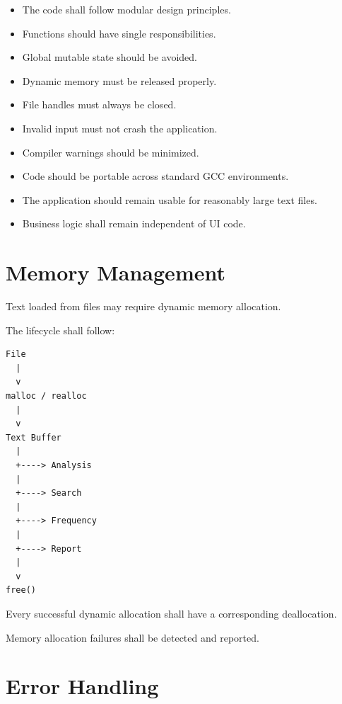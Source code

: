 \documentclass[12pt,a4paper]{article}
\begin{document}
\begin{itemize}
    \item The code shall follow modular design principles.
    \item Functions should have single responsibilities.
    \item Global mutable state should be avoided.
    \item Dynamic memory must be released properly.
    \item File handles must always be closed.
    \item Invalid input must not crash the application.
    \item Compiler warnings should be minimized.
    \item Code should be portable across standard GCC environments.
    \item The application should remain usable for reasonably large
          text files.
    \item Business logic shall remain independent of UI code.
\end{itemize}


\section{Memory Management}

Text loaded from files may require dynamic memory allocation.

The lifecycle shall follow:

\begin{verbatim}
File
  |
  v
malloc / realloc
  |
  v
Text Buffer
  |
  +----> Analysis
  |
  +----> Search
  |
  +----> Frequency
  |
  +----> Report
  |
  v
free()
\end{verbatim}

Every successful dynamic allocation shall have a corresponding
deallocation.

Memory allocation failures shall be detected and reported.


\section{Error Handling}
\end{document}
